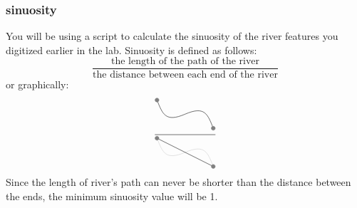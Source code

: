 \documentclass{article}
\begin{document}
\subsubsection{sinuosity}
You will be using a script to calculate the sinuosity of the river features you digitized earlier in the lab.  Sinuosity is defined as follows: 
\begin{equation*}
    \frac{\text{the length of the path of the river}}{\text{the distance between each end of the river}}
\end{equation*}
or graphically:
\begin{equation*}
    \frac{
          \begin{tikzpicture}
              \draw (0,1) .. controls (.2, .5) and (.3, .2) .. (1, .5)
                          .. controls (1.7, .8) and (1.8, .5) .. (2, 0);
              \filldraw[gray] (0,1) circle [radius=2pt]
                              (2,0) circle [radius=2pt];
          \end{tikzpicture}
      }{
          \begin{tikzpicture}
             \draw[black!20] (0,1) .. controls (.2, .5) and (.3, .2) .. (1, .5)
                               .. controls (1.7, .8) and (1.8, .5) .. (2,0);
              \draw (0,1) -- (2,0);
              \filldraw[gray] (0,1) circle [radius=2pt]
                              (2,0) circle [radius=2pt];
          \end{tikzpicture}
       }
\end{equation*}
Since the length of river's path can never be shorter than the distance between the ends, the minimum sinuosity value will be 1.
\end{document}
